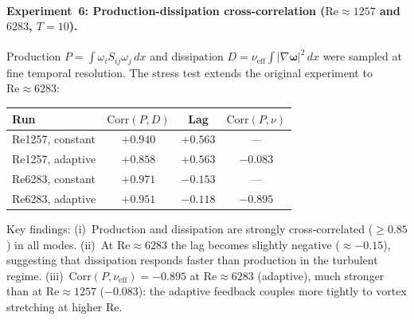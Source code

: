 \paragraph{Experiment~6: Production-dissipation
cross-correlation ($\mathrm{Re} \approx 1257$ and $6283$, $T = 10$).}
Production $P = \int \omega_i S_{ij} \omega_j\,dx$ and
dissipation $D = \nu_{\mathrm{eff}}\int |\nabla\bm{\omega}|^2\,dx$
were sampled at fine temporal resolution.
The stress test extends the original experiment to
$\mathrm{Re}\approx 6283$:
\begin{center}
\begin{tabular}{@{}lccc@{}}
\toprule
Run & $\mathrm{Corr}(P,D)$ & Lag & $\mathrm{Corr}(P,\nu)$ \\
\midrule
Re1257, constant & $+0.940$ & $+0.563$ & --- \\
Re1257, adaptive & $+0.858$ & $+0.563$ & $-0.083$ \\
Re6283, constant & $+0.971$ & $-0.153$ & --- \\
Re6283, adaptive & $+0.951$ & $-0.118$ & $-0.895$ \\
\bottomrule
\end{tabular}
\end{center}
Key findings: (i)~Production and dissipation are strongly
cross-correlated ($\ge 0.85$) in all modes.
(ii)~At $\mathrm{Re}\approx 6283$ the lag becomes slightly
negative ($\approx -0.15$), suggesting that dissipation
responds faster than production in the turbulent regime.
(iii)~$\mathrm{Corr}(P, \nu_{\mathrm{eff}}) = -0.895$
at $\mathrm{Re}\approx 6283$ (adaptive), much stronger
than at $\mathrm{Re}\approx 1257$ ($-0.083$): the
adaptive feedback couples more tightly to vortex stretching
at higher Re.

